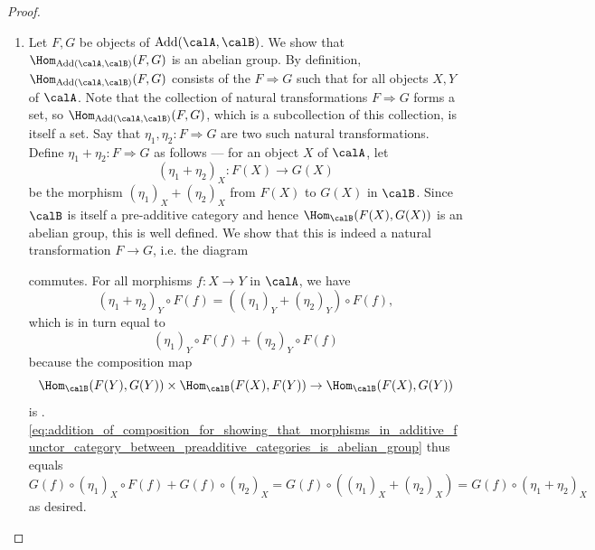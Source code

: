 \begin{proof}
    \begin{enumerate}
        \item Let $F, G$ be objects of $\text{Add}(\calA, \calB)$. We show that $\Hom_{\text{Add}(\calA, \calB)}(F,G)$ is an abelian group. 
        By definition, $\Hom_{\text{Add}(\calA, \calB)}(F,G)$ consists of the  $F \Rightarrow G$ such that for all objects $X,Y$ of $\calA$. Note that the collection of natural transformations $F \Rightarrow G$ forms a set, so $\Hom_{\text{Add}(\calA, \calB)}(F,G)$, which is a subcollection of this collection, is itself a set. Say that $\eta_1,\eta_2: F \Rightarrow G$ are two such natural transformations. Define $\eta_1+\eta_2: F \Rightarrow G$ as follows --- for an object $X$ of $\calA$, let 
        $$(\eta_1+\eta_2)_X: F(X) \to G(X)$$
        be the morphism $(\eta_1)_X + (\eta_2)_X$ from $F(X)$ to $G(X)$ in $\calB$. Since $\calB$ is itself a pre-additive category and hence $\Hom_\calB(F(X), G(X))$ is an abelian group, this is well defined. We show that this is indeed a natural transformation $F \to G$, i.e. the diagram 
        \begin{center}
        \end{center}
        commutes. For all morphisms $f: X \to Y$ in $\calA$, we have 
        $$(\eta_1+\eta_2)_Y \circ F(f) = ((\eta_1)_Y + (\eta_2)_Y ) \circ F(f),$$
        which is in turn equal to
        \begin{equation} \label{eq:addition_of_composition_for_showing_that_morphisms_in_additive_functor_category_between_preadditive_categories_is_abelian_group}
        (\eta_1)_Y \circ F(f) + (\eta_2)_Y \circ F(f)
        \end{equation}
        because the composition map
        $$\Hom_{\calB}(F(Y), G(Y)) \times \Hom_{\calB}(F(X), F(Y)) \to \Hom_{\calB}(F(X), G(Y))$$
        is . \eqref{eq:addition_of_composition_for_showing_that_morphisms_in_additive_functor_category_between_preadditive_categories_is_abelian_group} thus equals
        $$ G(f) \circ (\eta_1)_X \circ F(f) + G(f) \circ (\eta_2)_X = G(f) \circ ((\eta_1)_X + (\eta_2)_X) = G(f) \circ (\eta_1+\eta_2)_X$$
        as desired. 


\end{enumerate}
\end{proof}
